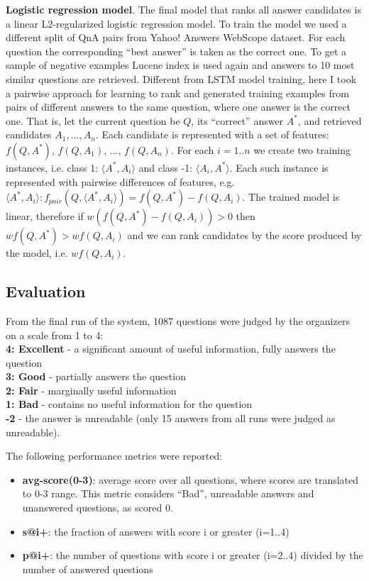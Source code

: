 \textbf{Logistic regression model}.
The final model that ranks all answer candidates is a linear L2-regularized logistic regression model.
To train the model we used a different split of QnA pairs from Yahoo! Answers WebScope dataset.
For each question the corresponding ``best answer'' is taken as the correct one.
To get a sample of negative examples Lucene index is used again and answers to 10 most similar questions are retrieved.
Different from LSTM model training, here I took a pairwise approach for learning to rank and generated training examples from pairs of different answers to the same question, where one answer is the correct one.
That is, let the current question be $Q$, its ``correct'' answer $A^*$, and retrieved candidates $A_1, ..., A_n$.
Each candidate is represented with a set of features: $f(Q, A^*)$, $f(Q, A_1)$, ..., $f(Q, A_n)$.
For each $i=1..n$ we create two training instances, i.e. class 1: $\langle A^*, A_i\rangle$ and class -1: $\langle A_i, A^*\rangle$.
Each such instance is represented with pairwise differences of features, e.g. $\langle A^*, A_i\rangle: f_{pair}(Q, \langle A^*, A_i\rangle) = f(Q, A^*) - f(Q, A_i)$.
The trained model is linear, therefore if $w(f(Q, A^*) - f(Q, A_i)) > 0$ then $w f(Q, A^*) > w f(Q, A_i)$ and we can rank candidates by the score produced by the model, i.e. $w f(Q, A_i)$.

\subsection{Evaluation}
\label{section:non-factoid:liveqa:evaluation}

From the final run of the system, 1087 questions were judged by the organizers on a scale from 1 to 4:\\
\textbf{4: Excellent} - a significant amount of useful information, fully answers the question\\
\textbf{3: Good} - partially answers the question\\
\textbf{2: Fair} - marginally useful information\\
\textbf{1: Bad} - contains no useful information for the question\\
\textbf{-2} - the answer is unreadable (only 15 answers from all runs were judged as unreadable).

The following performance metrics were reported:

\begin{itemize}
\item \textbf{avg-score(0-3)}: average score over all questions, where scores are translated to 0-3 range. This metric considers ``Bad'', unreadable answers and unanswered questions, as scored 0.
\item \textbf{s@i+}: the fraction of answers with score i or greater (i=1..4)
\item \textbf{p@i+}: the number of questions with score i or greater (i=2..4) divided by the number of answered questions
\end{itemize}

